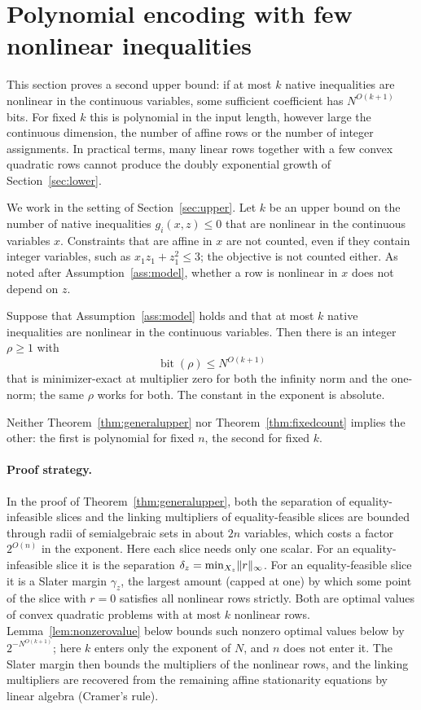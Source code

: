 \section{Polynomial encoding with few nonlinear inequalities}
\label{sec:fixedcount}
This section proves a second upper bound: if at most $k$ native
inequalities are nonlinear in the continuous variables, some sufficient
coefficient has $N^{O(k+1)}$ bits. For fixed $k$ this is polynomial in the
input length, however large the continuous dimension, the number of affine
rows or the number of integer assignments. In practical terms, many linear
rows together with a few convex quadratic rows cannot produce the doubly
exponential growth of Section~\ref{sec:lower}.

We work in the setting of Section~\ref{sec:upper}. Let $k$ be an upper
bound on the number of native inequalities $g_i(x,z)\le0$ that are
nonlinear in the continuous variables $x$. Constraints that are affine in
$x$ are not counted, even if they contain integer variables, such as
$x_1z_1+z_1^2\le3$; the objective is not counted either. As noted after
Assumption~\ref{ass:model}, whether a row is nonlinear in $x$ does not
depend on $z$.

\begin{theorem}\label{thm:fixedcount}
Suppose that Assumption~\ref{ass:model} holds and that at most $k$
native inequalities are nonlinear in the continuous variables. Then there is an integer $\rho\ge1$ with
\begin{equation}\label{eq:fixedbits}
 \operatorname{bit}(\rho)\le N^{O(k+1)}
\end{equation}
that is minimizer-exact at multiplier zero for both the infinity norm and
the one-norm; the same $\rho$ works for both. The constant in the exponent
is absolute.
\end{theorem}
Neither Theorem~\ref{thm:generalupper} nor Theorem~\ref{thm:fixedcount}
implies the other: the first is polynomial for fixed $n$, the second for
fixed $k$.

\paragraph{Proof strategy.}
In the proof of Theorem~\ref{thm:generalupper}, both the separation of
equality-infeasible slices and the linking multipliers of
equality-feasible slices are bounded through radii of semialgebraic sets
in about $2n$ variables, which costs a factor $2^{O(n)}$ in the exponent.
Here each slice needs only one scalar. For an equality-infeasible slice
it is the separation $\delta_z=\min_{X_z}\lVert r\rVert_\infty$. For an
equality-feasible slice it is a Slater margin $\gamma_z$, the largest
amount (capped at one) by which some point of the slice with $r=0$
satisfies all nonlinear rows strictly. Both are optimal values of convex quadratic problems with
at most $k$ nonlinear rows. Lemma~\ref{lem:nonzerovalue} below bounds such
nonzero optimal values below by $2^{-N^{O(k+1)}}$; here $k$ enters only
the exponent of $N$, and $n$ does not enter it.
The Slater margin then bounds the multipliers of the nonlinear rows, and
the linking multipliers are recovered from the remaining affine
stationarity equations by linear algebra (Cramer's rule).

